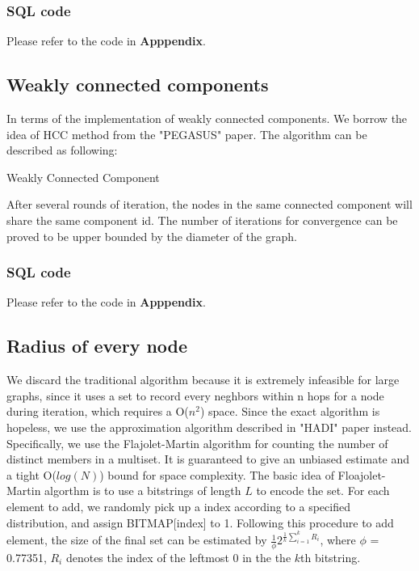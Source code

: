 \subsubsection{SQL code}
Please refer to the code in {\bf Apppendix}.

\subsection{Weakly connected components}
In terms of the implementation of weakly connected components. We borrow the idea of HCC method from the "PEGASUS" paper.\cite{Kang09}
The algorithm can be described as following:
\begin{algorithm}
\caption{Weakly Connected Component}
\begin{algorithmic}
\REPEAT
{}
\end{algorithmic}
\end{algorithm}
After several rounds of iteration, the nodes in the same connected component will share the same component id.
The number of iterations for convergence can be proved to be upper bounded by the diameter of the graph.

\subsubsection{SQL code}
Please refer to the code in {\bf Apppendix}.

\subsection{Radius of every node}
We discard the traditional algorithm because it is extremely infeasible for large graphs, since it uses a set to record every neghbors within n hops for a node during iteration, which requires a O($n^2$) space.
Since the exact algorithm is hopeless, we use the approximation algorithm described in "HADI" paper\cite{DBLP:journals/tkdd/KangTAFL11} instead. Specifically, we use the Flajolet-Martin algorithm for counting the number of distinct members in a multiset. It is guaranteed to give an unbiased estimate and a tight O($log(N)$) bound for space complexity. The basic idea of Floajolet-Martin algorthm is to use a bitstrings of length $L$ to encode the set. For each element to add, we randomly pick up a index according to a specified distribution, and assign BITMAP[index] to 1. Following this procedure to add element, the size of the final set can be estimated by $\frac{1}{\phi} 2^{\frac{1}{k}\sum_{i=1}^k R_i}$, where $\phi$ = 0.77351, $R_i$ denotes the index of the leftmost 0 in the the $k$th bitstring.

